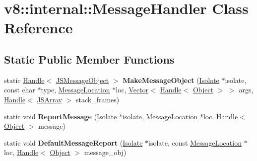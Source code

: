 \hypertarget{classv8_1_1internal_1_1_message_handler}{}\section{v8\+:\+:internal\+:\+:Message\+Handler Class Reference}
\label{classv8_1_1internal_1_1_message_handler}
\subsection*{Static Public Member Functions}
\begin{DoxyCompactItemize}
\item 
\hypertarget{classv8_1_1internal_1_1_message_handler_ade065e6c9a8956b7a12fbb63fcfaf775}{}static \hyperlink{classv8_1_1internal_1_1_handle}{Handle}$<$ \hyperlink{classv8_1_1internal_1_1_j_s_message_object}{J\+S\+Message\+Object} $>$ {\bfseries Make\+Message\+Object} (\hyperlink{classv8_1_1internal_1_1_isolate}{Isolate} $\ast$isolate, const char $\ast$type, \hyperlink{classv8_1_1internal_1_1_message_location}{Message\+Location} $\ast$loc, \hyperlink{classv8_1_1internal_1_1_vector}{Vector}$<$ \hyperlink{classv8_1_1internal_1_1_handle}{Handle}$<$ \hyperlink{classv8_1_1internal_1_1_object}{Object} $>$ $>$ args, \hyperlink{classv8_1_1internal_1_1_handle}{Handle}$<$ \hyperlink{classv8_1_1internal_1_1_j_s_array}{J\+S\+Array} $>$ stack\+\_\+frames)\label{classv8_1_1internal_1_1_message_handler_ade065e6c9a8956b7a12fbb63fcfaf775}

\item 
\hypertarget{classv8_1_1internal_1_1_message_handler_a0159bb1346799ef8d790fd9d65b43c16}{}static void {\bfseries Report\+Message} (\hyperlink{classv8_1_1internal_1_1_isolate}{Isolate} $\ast$isolate, \hyperlink{classv8_1_1internal_1_1_message_location}{Message\+Location} $\ast$loc, \hyperlink{classv8_1_1internal_1_1_handle}{Handle}$<$ \hyperlink{classv8_1_1internal_1_1_object}{Object} $>$ message)\label{classv8_1_1internal_1_1_message_handler_a0159bb1346799ef8d790fd9d65b43c16}

\item 
\hypertarget{classv8_1_1internal_1_1_message_handler_ac3187fbef495d0ee967c27a5edb8b591}{}static void {\bfseries Default\+Message\+Report} (\hyperlink{classv8_1_1internal_1_1_isolate}{Isolate} $\ast$isolate, const \hyperlink{classv8_1_1internal_1_1_message_location}{Message\+Location} $\ast$loc, \hyperlink{classv8_1_1internal_1_1_handle}{Handle}$<$ \hyperlink{classv8_1_1internal_1_1_object}{Object} $>$ message\+\_\+obj)\label{classv8_1_1internal_1_1_message_handler_ac3187fbef495d0ee967c27a5edb8b591}


\end{DoxyCompactItemize}

